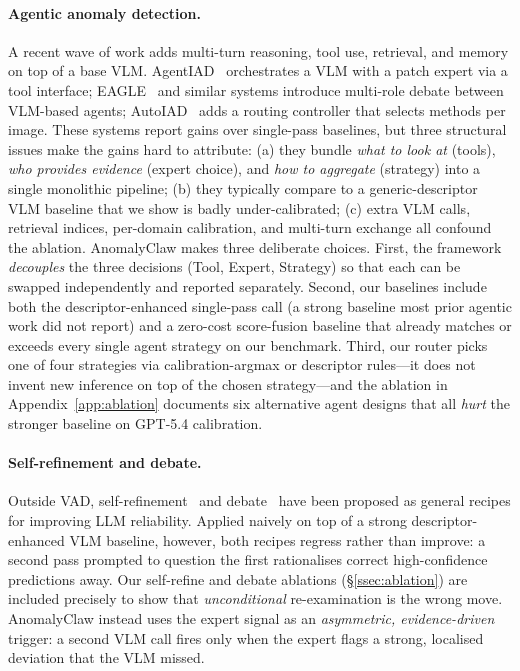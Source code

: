 \paragraph{Agentic anomaly detection.}
A recent wave of work adds multi-turn reasoning, tool use, retrieval, and memory on top of a base VLM. AgentIAD~\citep{zhang2025agentiad} orchestrates a VLM with a patch expert via a tool interface; EAGLE~\citep{chen2026eagle} and similar systems introduce multi-role debate between VLM-based agents; AutoIAD~\citep{wei2025autoiad} adds a routing controller that selects methods per image. These systems report gains over single-pass baselines, but three structural issues make the gains hard to attribute: (a) they bundle \emph{what to look at} (tools), \emph{who provides evidence} (expert choice), and \emph{how to aggregate} (strategy) into a single monolithic pipeline; (b) they typically compare to a generic-descriptor VLM baseline that we show is badly under-calibrated; (c) extra VLM calls, retrieval indices, per-domain calibration, and multi-turn exchange all confound the ablation. AnomalyClaw makes three deliberate choices. First, the framework \emph{decouples} the three decisions (Tool, Expert, Strategy) so that each can be swapped independently and reported separately. Second, our baselines include both the descriptor-enhanced single-pass call (a strong baseline most prior agentic work did not report) and a zero-cost score-fusion baseline that already matches or exceeds every single agent strategy on our benchmark. Third, our router picks one of four strategies via calibration-argmax or descriptor rules---it does not invent new inference on top of the chosen strategy---and the ablation in Appendix~\ref{app:ablation} documents six alternative agent designs that all \emph{hurt} the stronger baseline on GPT-5.4 calibration.

\paragraph{Self-refinement and debate.}
Outside VAD, self-refinement~\citep{madaan2023selfrefine} and debate~\citep{du2023debate,irving2018debate} have been proposed as general recipes for improving LLM reliability. Applied naively on top of a strong descriptor-enhanced VLM baseline, however, both recipes regress rather than improve: a second pass prompted to question the first rationalises correct high-confidence predictions away. Our self-refine and debate ablations (\S\ref{ssec:ablation}) are included precisely to show that \emph{unconditional} re-examination is the wrong move. AnomalyClaw instead uses the expert signal as an \emph{asymmetric, evidence-driven} trigger: a second VLM call fires only when the expert flags a strong, localised deviation that the VLM missed.


